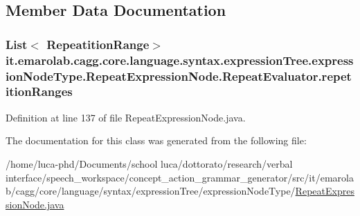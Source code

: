 \subsection{Member Data Documentation}
\hypertarget{classit_1_1emarolab_1_1cagg_1_1core_1_1language_1_1syntax_1_1expressionTree_1_1expressionNodeTyp785488d13bbbabc8bec5d8852bfc23de_a909c6ec17b8c003cdd09f607527cea0b}{
\subsubsection[{repetition\-Ranges}]{\setlength{\rightskip}{0pt plus 5cm}List$<$ {\bf Repeatition\-Range}$>$ it.\-emarolab.\-cagg.\-core.\-language.\-syntax.\-expression\-Tree.\-expression\-Node\-Type.\-Repeat\-Expression\-Node.\-Repeat\-Evaluator.\-repetition\-Ranges\hspace{0.3cm}{\ttfamily [private]}}}\label{classit_1_1emarolab_1_1cagg_1_1core_1_1language_1_1syntax_1_1expressionTree_1_1expressionNodeTyp785488d13bbbabc8bec5d8852bfc23de_a909c6ec17b8c003cdd09f607527cea0b}


Definition at line 137 of file Repeat\-Expression\-Node.\-java.



The documentation for this class was generated from the following file\-:\begin{DoxyCompactItemize}
\item 
/home/luca-\/phd/\-Documents/school luca/dottorato/research/verbal interface/speech\-\_\-workspace/concept\-\_\-action\-\_\-grammar\-\_\-generator/src/it/emarolab/cagg/core/language/syntax/expression\-Tree/expression\-Node\-Type/\hyperlink{RepeatExpressionNode_8java}{Repeat\-Expression\-Node.\-java}\end{DoxyCompactItemize}
